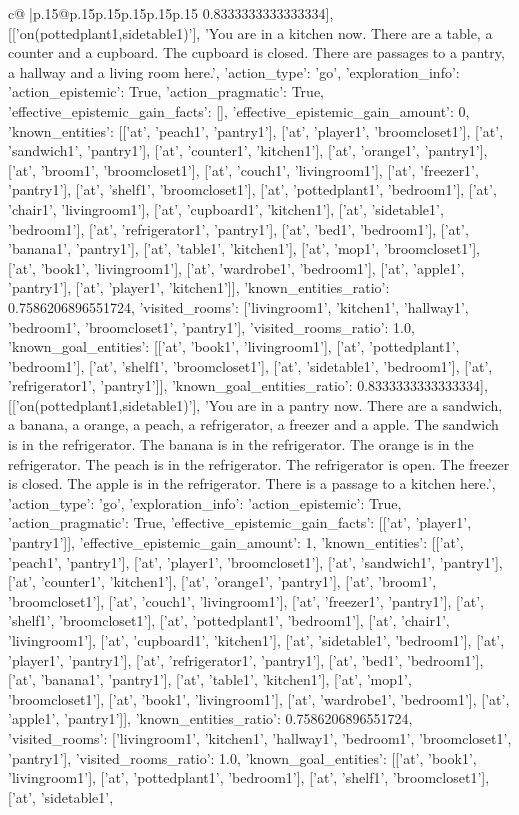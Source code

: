 \documentclass{article}
\begin{document}
{\begin{supertabular}{c@{$\;$}|p{.15\linewidth}@{}p{.15\linewidth}p{.15\linewidth}p{.15\linewidth}p{.15\linewidth}p{.15\linewidth}}
{{{0.8333333333333334}}], [['on(pottedplant1,sidetable1)'], 'You are in a kitchen now. There are a table, a counter and a cupboard. The cupboard is closed. There are passages to a pantry, a hallway and a living room here.', {'action_type': 'go', 'exploration_info': {'action_epistemic': True, 'action_pragmatic': True, 'effective_epistemic_gain_facts': [], 'effective_epistemic_gain_amount': 0, 'known_entities': [['at', 'peach1', 'pantry1'], ['at', 'player1', 'broomcloset1'], ['at', 'sandwich1', 'pantry1'], ['at', 'counter1', 'kitchen1'], ['at', 'orange1', 'pantry1'], ['at', 'broom1', 'broomcloset1'], ['at', 'couch1', 'livingroom1'], ['at', 'freezer1', 'pantry1'], ['at', 'shelf1', 'broomcloset1'], ['at', 'pottedplant1', 'bedroom1'], ['at', 'chair1', 'livingroom1'], ['at', 'cupboard1', 'kitchen1'], ['at', 'sidetable1', 'bedroom1'], ['at', 'refrigerator1', 'pantry1'], ['at', 'bed1', 'bedroom1'], ['at', 'banana1', 'pantry1'], ['at', 'table1', 'kitchen1'], ['at', 'mop1', 'broomcloset1'], ['at', 'book1', 'livingroom1'], ['at', 'wardrobe1', 'bedroom1'], ['at', 'apple1', 'pantry1'], ['at', 'player1', 'kitchen1']], 'known_entities_ratio': 0.7586206896551724, 'visited_rooms': ['livingroom1', 'kitchen1', 'hallway1', 'bedroom1', 'broomcloset1', 'pantry1'], 'visited_rooms_ratio': 1.0, 'known_goal_entities': [['at', 'book1', 'livingroom1'], ['at', 'pottedplant1', 'bedroom1'], ['at', 'shelf1', 'broomcloset1'], ['at', 'sidetable1', 'bedroom1'], ['at', 'refrigerator1', 'pantry1']], 'known_goal_entities_ratio': 0.8333333333333334}}], [['on(pottedplant1,sidetable1)'], 'You are in a pantry now. There are a sandwich, a banana, a orange, a peach, a refrigerator, a freezer and a apple. The sandwich is in the refrigerator. The banana is in the refrigerator. The orange is in the refrigerator. The peach is in the refrigerator. The refrigerator is open. The freezer is closed. The apple is in the refrigerator. There is a passage to a kitchen here.', {'action_type': 'go', 'exploration_info': {'action_epistemic': True, 'action_pragmatic': True, 'effective_epistemic_gain_facts': [['at', 'player1', 'pantry1']], 'effective_epistemic_gain_amount': 1, 'known_entities': [['at', 'peach1', 'pantry1'], ['at', 'player1', 'broomcloset1'], ['at', 'sandwich1', 'pantry1'], ['at', 'counter1', 'kitchen1'], ['at', 'orange1', 'pantry1'], ['at', 'broom1', 'broomcloset1'], ['at', 'couch1', 'livingroom1'], ['at', 'freezer1', 'pantry1'], ['at', 'shelf1', 'broomcloset1'], ['at', 'pottedplant1', 'bedroom1'], ['at', 'chair1', 'livingroom1'], ['at', 'cupboard1', 'kitchen1'], ['at', 'sidetable1', 'bedroom1'], ['at', 'player1', 'pantry1'], ['at', 'refrigerator1', 'pantry1'], ['at', 'bed1', 'bedroom1'], ['at', 'banana1', 'pantry1'], ['at', 'table1', 'kitchen1'], ['at', 'mop1', 'broomcloset1'], ['at', 'book1', 'livingroom1'], ['at', 'wardrobe1', 'bedroom1'], ['at', 'apple1', 'pantry1']], 'known_entities_ratio': 0.7586206896551724, 'visited_rooms': ['livingroom1', 'kitchen1', 'hallway1', 'bedroom1', 'broomcloset1', 'pantry1'], 'visited_rooms_ratio': 1.0, 'known_goal_entities': [['at', 'book1', 'livingroom1'], ['at', 'pottedplant1', 'bedroom1'], ['at', 'shelf1', 'broomcloset1'], ['at', 'sidetable1', }}}
\end{supertabular}}
\end{document}
